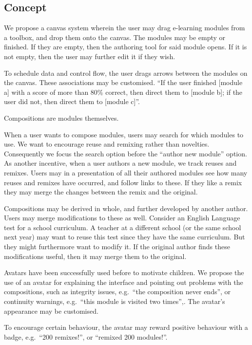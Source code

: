 \subsection{Concept }
We propose a canvas system wherein the user may drag e-learning modules from a 
toolbox, and drop them onto the canvas. The modules may be empty or finished. 
If they are empty, then the authoring tool for said module opens. If it is not 
empty, then the user may further edit it if they wish.

To schedule data and control flow, the user drags arrows between the modules 
on the canvas. These associations may be customised. ``If the user finished 
[module a] with a score of more than 80\% correct, then direct them to [module 
b]; if the user did not, then direct them to [module c]''.

Compositions are modules themselves.

When a user wants to compose modules, users may search for which modules to 
use. We want to encourage reuse and remixing rather than novelties. 
Consequently we focus the search option before the ``author new module'' 
option. As another incentive, when a user authors a new module, we track 
reuses and remixes. Users may in a presentation of all their authored modules 
see how many reuses and remixes have occurred, and follow links to these. If 
they like a remix they may merge the changes between the remix and the 
original.

Compositions may be derived in whole, and further developed by another author. 
Users may merge modifications to these as well. Consider an English Language 
test for a school curriculum. A teacher at a different school (or the same 
school next year) may want to reuse this test since they have the same 
curriculum. But they might furthermore want to modify it. If the original 
author finds these modifications useful, then it may merge them to the 
original.

Avatars have been successfully used before to motivate 
children\cite{gossen2012search}. We propose the use of an avatar for 
explaining the interface and pointing out problems with the compositions, such 
as integrity issues, e.g.\ ``the composition never ends'', or continuity 
warnings, e.g.\ ``this module is visited two times'',. The avatar's appearance 
may be customised.

To encourage certain behaviour, the avatar may reward positive behaviour with 
a badge, e.g.\ ``200 remixes!'', or ``remixed 200 modules!''.

